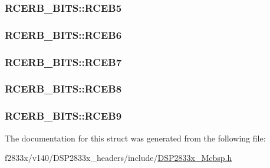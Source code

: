 \subsubsection[{R\+C\+E\+B5}]{ R\+C\+E\+R\+B\+\_\+\+B\+I\+T\+S\+::\+R\+C\+E\+B5}\label{struct_r_c_e_r_b___b_i_t_s_a1384a8a882eb1f5d3f48f9510c6f6ce6}
\hypertarget{struct_r_c_e_r_b___b_i_t_s_a7a3bd13264e0ff0439b6e52b2523de9b}{}
\subsubsection[{R\+C\+E\+B6}]{ R\+C\+E\+R\+B\+\_\+\+B\+I\+T\+S\+::\+R\+C\+E\+B6}\label{struct_r_c_e_r_b___b_i_t_s_a7a3bd13264e0ff0439b6e52b2523de9b}
\hypertarget{struct_r_c_e_r_b___b_i_t_s_afb2a9a64a0633976c60b83ff43e839b8}{}
\subsubsection[{R\+C\+E\+B7}]{ R\+C\+E\+R\+B\+\_\+\+B\+I\+T\+S\+::\+R\+C\+E\+B7}\label{struct_r_c_e_r_b___b_i_t_s_afb2a9a64a0633976c60b83ff43e839b8}
\hypertarget{struct_r_c_e_r_b___b_i_t_s_a6c4e1d664c4c2cc4234ef0fa56a8008e}{}
\subsubsection[{R\+C\+E\+B8}]{ R\+C\+E\+R\+B\+\_\+\+B\+I\+T\+S\+::\+R\+C\+E\+B8}\label{struct_r_c_e_r_b___b_i_t_s_a6c4e1d664c4c2cc4234ef0fa56a8008e}
\hypertarget{struct_r_c_e_r_b___b_i_t_s_a00e72701f7fff40994e5b5fa70f53ccc}{}
\subsubsection[{R\+C\+E\+B9}]{ R\+C\+E\+R\+B\+\_\+\+B\+I\+T\+S\+::\+R\+C\+E\+B9}\label{struct_r_c_e_r_b___b_i_t_s_a00e72701f7fff40994e5b5fa70f53ccc}


The documentation for this struct was generated from the following file\+:\begin{DoxyCompactItemize}
\item 
f2833x/v140/\+D\+S\+P2833x\+\_\+headers/include/\hyperlink{_d_s_p2833x___mcbsp_8h}{D\+S\+P2833x\+\_\+\+Mcbsp.\+h}\end{DoxyCompactItemize}
